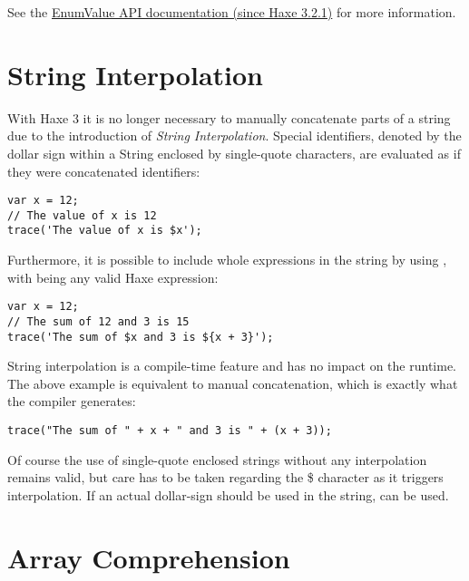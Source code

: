 See the \href{https://api.haxe.org/haxe/EnumValueTools.html#match}{EnumValue API documentation (since Haxe 3.2.1)} for more information.



\section{String Interpolation}
\label{lf-string-interpolation}

With Haxe 3 it is no longer necessary to manually concatenate parts of a string due to the introduction of \emph{String Interpolation}. Special identifiers, denoted by the dollar sign \expr{\$} within a String enclosed by single-quote  characters, are evaluated as if they were concatenated identifiers:

\begin{lstlisting}
var x = 12;
// The value of x is 12
trace('The value of x is $x');
\end{lstlisting}
Furthermore, it is possible to include whole expressions in the string by using , with  being any valid Haxe expression:

\begin{lstlisting}
var x = 12;
// The sum of 12 and 3 is 15
trace('The sum of $x and 3 is ${x + 3}');
\end{lstlisting}
String interpolation is a compile-time feature and has no impact on the runtime. The above example is equivalent to manual concatenation, which is exactly what the compiler generates:

\begin{lstlisting}
trace("The sum of " + x + " and 3 is " + (x + 3));
\end{lstlisting}
Of course the use of single-quote enclosed strings without any interpolation remains valid, but care has to be taken regarding the \$ character as it triggers interpolation. If an actual dollar-sign should be used in the string, \expr{\$\$} can be used.



\section{Array Comprehension}
\label{lf-array-comprehension}

